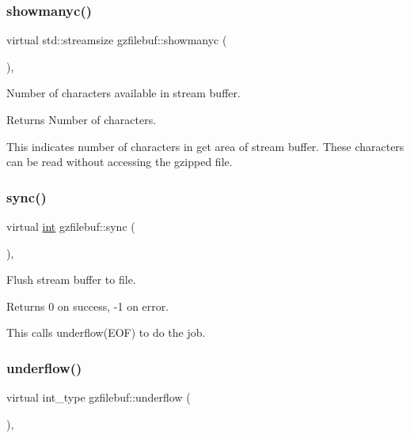 \subsubsection{\texorpdfstring{showmanyc()}{showmanyc()}}
{\footnotesize\ttfamily virtual std\+::streamsize gzfilebuf\+::showmanyc (\begin{DoxyParamCaption}{ }\end{DoxyParamCaption})\hspace{0.3cm}{\ttfamily [protected]}, {\ttfamily [virtual]}}



Number of characters available in stream buffer. 

\begin{DoxyReturn}{Returns}
Number of characters.
\end{DoxyReturn}
This indicates number of characters in get area of stream buffer. These characters can be read without accessing the gzipped file. \mbox{\label{classgzfilebuf_a8fdf6b079487c0034cb920c63c9eaf55}} 
\subsubsection{\texorpdfstring{sync()}{sync()}}
{\footnotesize\ttfamily virtual \hyperlink{lp__lib_8h_adeb9ec6400320e4923ac9d836d509ddb}{int} gzfilebuf\+::sync (\begin{DoxyParamCaption}{ }\end{DoxyParamCaption})\hspace{0.3cm}{\ttfamily [protected]}, {\ttfamily [virtual]}}



Flush stream buffer to file. 

\begin{DoxyReturn}{Returns}
0 on success, -\/1 on error.
\end{DoxyReturn}
This calls underflow(\+E\+O\+F) to do the job. \mbox{\label{classgzfilebuf_a23768f9935022e54608c53173f0047c0}} 
\subsubsection{\texorpdfstring{underflow()}{underflow()}}
{\footnotesize\ttfamily virtual int\+\_\+type gzfilebuf\+::underflow (\begin{DoxyParamCaption}{ }\end{DoxyParamCaption})\hspace{0.3cm}{\ttfamily [protected]}, {\ttfamily [virtual]}}



